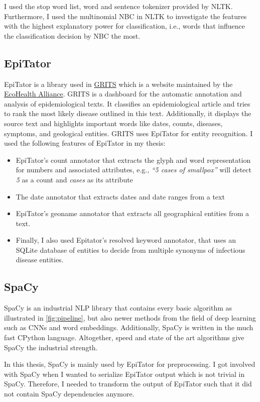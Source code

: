 I used the stop word list, word and sentence tokenizer provided by NLTK.
Furthermore, I used the multinomial NBC in NLTK to investigate the features with the highest explanatory power for classification, i.e., words that influence the classification decision by NBC the most.


\subsection{EpiTator}
EpiTator is a library used in \href{https://grits.eha.io}{GRITS} which is a website maintained by the \href{https://www.ecohealthalliance.org}{EcoHealth Alliance}.
GRITS is a dashboard for the automatic annotation and analysis of epidemiological texts.
It classifies an epidemiological article and tries to rank the most likely disease outlined in this text.
Additionally, it displays the source text and highlights important words like dates, counts, diseases, symptoms, and geological entities.
GRITS uses EpiTator for entity recognition.
I used the following features of EpiTator in my thesis:
\begin{itemize}
  \item EpiTator's count annotator that extracts the glyph and word representation for numbers and associated attributes, e.g., \textit{``5 cases of smallpox''} will detect \textit{5} as a count and \textit{cases} as its attribute
  \item The date annotator that extracts dates and date ranges from a text
  \item EpiTator's geoname annotator that extracts all geographical entities from a text.
  \item Finally, I also used Epitator's resolved keyword annotator, that uses an SQLite database of entities to decide from multiple synonyms of infectious disease entities.
\end{itemize}


\subsection{SpaCy}
SpaCy is an industrial NLP library that contains every basic algorithm as illustrated in \ref{fig:pipeline}, but also newer methods from the field of deep learning such as CNNs and word embeddings. Additionally, SpaCy is written in the much fast CPython language. Altogether, speed and state of the art algorithms give SpaCy the industrial strength.

In this thesis, SpaCy is mainly used by EpiTator for preprocessing. I got involved with SpaCy when I wanted to serialize EpiTator output which is not trivial in SpaCy. Therefore, I needed to transform the output of EpiTator such that it did not contain SpaCy dependencies anymore.

